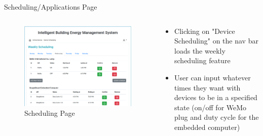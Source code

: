 \documentclass{beamer}
\begin{document}
\begin{frame}{Scheduling/Applications Page}{} %

    \begin{columns}
      \begin{figure}
            \centering
            \includegraphics[scale=0.15]{figs/webServer/Applications_screen.png}
            \caption{Scheduling Page}
            \label{fig:schedulingl}
        \end{figure}
        \begin{block}{}
          \begin{itemize}
            \item Clicking on "Device Scheduling" on the nav bar loads the weekly scheduling feature
            \item User can input whatever times they want with devices to be in a specified state (on/off for WeMo plug and duty cycle for the embedded computer)
        \end{itemize}
        \end{block}
    \end{columns}
\end{frame}
\end{document}
